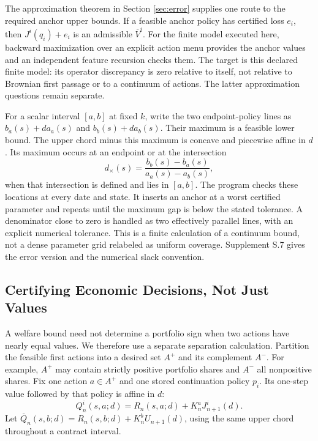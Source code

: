 The approximation theorem in Section \ref{sec:error} supplies one route to the required anchor upper bounds. If a feasible anchor policy has certified loss $e_i$, then $J^i(q_i)+e_i$ is an admissible $\overline V^i$. For the finite model executed here, backward maximization over an explicit action menu provides the anchor values and an independent feature recursion checks them. The target is this declared finite model: its operator discrepancy is zero relative to itself, not relative to Brownian first passage or to a continuum of actions. The latter approximation questions remain separate.

For a scalar interval $[a,b]$ at fixed $k$, write the two endpoint-policy lines as $b_a(s)+d a_a(s)$ and $b_b(s)+d a_b(s)$. Their maximum is a feasible lower bound. The upper chord minus this maximum is concave and piecewise affine in $d$. Its maximum occurs at an endpoint or at the intersection
\begin{equation}
 d_\times(s)=\frac{b_b(s)-b_a(s)}{a_a(s)-a_b(s)},
 \label{eq:intersection}
\end{equation}
when that intersection is defined and lies in $[a,b]$. The program checks these locations at every date and state. It inserts an anchor at a worst certified parameter and repeats until the maximum gap is below the stated tolerance. A denominator close to zero is handled as two effectively parallel lines, with an explicit numerical tolerance. This is a finite calculation of a continuum bound, not a dense parameter grid relabeled as uniform coverage. Supplement S.7 gives the error version and the numerical slack convention.

\subsection{Certifying Economic Decisions, Not Just Values}
A welfare bound need not determine a portfolio sign when two actions have nearly equal values. We therefore use a separate separation calculation. Partition the feasible first actions into a desired set $A^+$ and its complement $A^-$. For example, $A^+$ may contain strictly positive portfolio shares and $A^-$ all nonpositive shares. Fix one action $a\in A^+$ and one stored continuation policy $p_i$. Its one-step value followed by that policy is affine in $d$:
\begin{equation}
 Q^i_n(s,a;d)=R_n(s,a;d)+K_n^aJ^i_{n+1}(d).
 \label{eq:tail_value}
\end{equation}
Let $\overline Q_n(s,b;d)=R_n(s,b;d)+K_n^bU_{n+1}(d)$, using the same upper chord throughout a contract interval.

